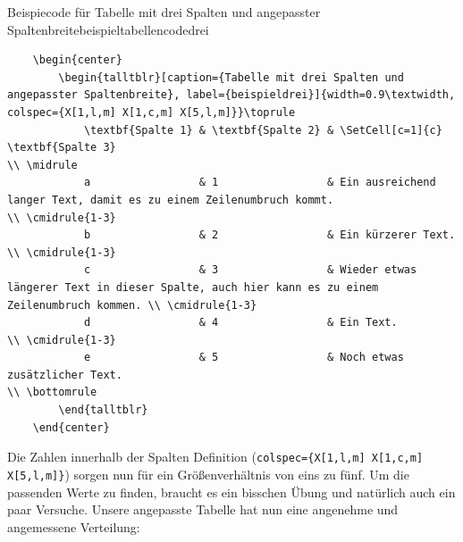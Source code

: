 \begin{code}{Beispiecode für Tabelle mit drei Spalten und angepasster Spaltenbreite}{beispieltabellencodedrei}
	\begin{verbatim}
	\begin{center}
		\begin{talltblr}[caption={Tabelle mit drei Spalten und angepasster Spaltenbreite}, label={beispieldrei}]{width=0.9\textwidth, colspec={X[1,l,m] X[1,c,m] X[5,l,m]}}\toprule
			\textbf{Spalte 1} & \textbf{Spalte 2} & \SetCell[c=1]{c} \textbf{Spalte 3}                                                            \\ \midrule
			a                 & 1                 & Ein ausreichend langer Text, damit es zu einem Zeilenumbruch kommt.                           \\ \cmidrule{1-3}
			b                 & 2                 & Ein kürzerer Text.                                                                            \\ \cmidrule{1-3}
			c                 & 3                 & Wieder etwas längerer Text in dieser Spalte, auch hier kann es zu einem Zeilenumbruch kommen. \\ \cmidrule{1-3}
			d                 & 4                 & Ein Text.                                                                                     \\ \cmidrule{1-3}
			e                 & 5                 & Noch etwas zusätzlicher Text.                                                                 \\ \bottomrule
		\end{talltblr}
	\end{center}
	\end{verbatim}
\end{code}

Die Zahlen innerhalb der Spalten Definition (\texttt{colspec=\{X[1,l,m]
	X[1,c,m] X[5,l,m]\}}) sorgen nun für ein Größenverhältnis
von eins zu fünf. Um die passenden Werte zu finden, braucht es ein bisschen
Übung und natürlich auch ein paar Versuche. Unsere angepasste Tabelle hat nun
eine angenehme und angemessene Verteilung:


